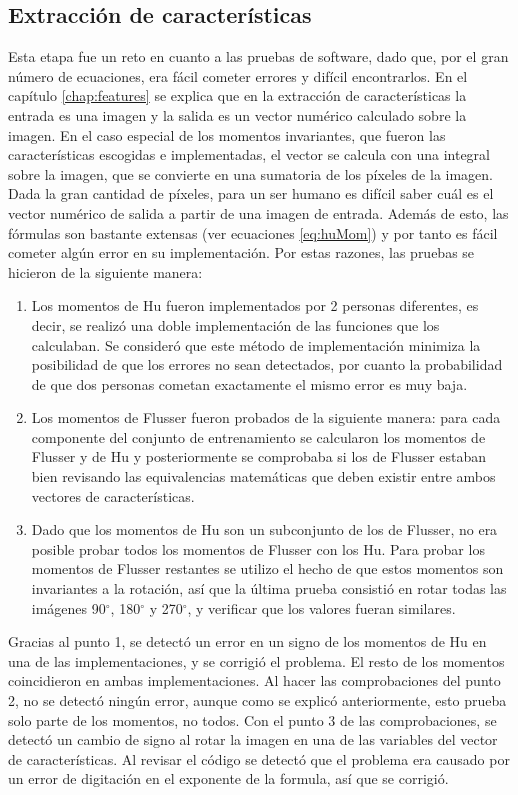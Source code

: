 \documentclass[a4paper, 11pt, oneside]{report}
\begin{document}
\subsection{Extracción de características}
Esta etapa fue un reto en cuanto a las pruebas de software, dado que, por el gran número de ecuaciones, era fácil cometer errores y difícil encontrarlos. En el capítulo \ref{chap:features} se explica que en la extracción de características la entrada es una imagen y la salida es un vector numérico calculado sobre la imagen. En el caso especial de los momentos invariantes, que fueron las características escogidas e implementadas, el vector se calcula con una integral sobre la imagen, que se convierte en una sumatoria de los píxeles de la imagen.
Dada la gran cantidad de píxeles, para un ser humano es difícil saber cuál es el vector numérico de salida a partir de una imagen de entrada. Además de esto, las fórmulas son bastante extensas (ver ecuaciones \ref{eq:huMom}) y por tanto es fácil cometer algún error en su implementación. Por estas razones, las pruebas se hicieron de la siguiente manera:
\begin{enumerate}
\item Los momentos de Hu fueron implementados por 2 personas diferentes, es decir, se realizó una doble implementación de las funciones que los calculaban. Se consideró que este método de implementación minimiza la posibilidad de que los errores no sean detectados, por cuanto la probabilidad de que dos personas cometan exactamente el mismo error es muy baja.
\item Los momentos de Flusser fueron probados de la siguiente manera: para cada componente del conjunto de entrenamiento se calcularon los momentos de Flusser y de Hu y posteriormente se comprobaba si los de Flusser estaban bien revisando las equivalencias matemáticas que deben existir entre ambos vectores de características. %
\item Dado que los momentos de Hu son un subconjunto de los de Flusser, no era posible probar todos los momentos de Flusser con los Hu. Para probar los momentos de Flusser restantes se utilizo el hecho de que estos momentos son invariantes a la rotación, así que la última prueba consistió en rotar todas las imágenes 90$^\circ$, 180$^\circ$ y 270$^\circ$, y verificar que los valores fueran similares.
\end{enumerate}
Gracias al punto 1, se detectó un error en un signo de los momentos de Hu en una de las implementaciones, y se corrigió el problema. El resto de los momentos coincidieron en ambas implementaciones. Al hacer las comprobaciones del punto 2, no se detectó ningún error, aunque como se explicó anteriormente, esto prueba solo parte de los momentos, no todos. Con el punto 3 de las comprobaciones, se detectó un cambio de signo al rotar la imagen en una de las variables del vector de características. Al revisar el código se detectó que el problema era causado por un error de digitación en el exponente de la formula, así que se corrigió.
\end{document}
